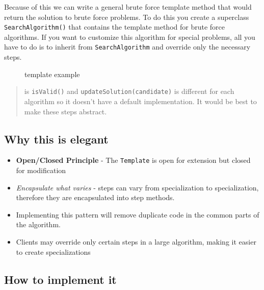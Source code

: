 Because of this we can write a general brute force template method that
would return the solution to brute force problems. To do this you create
a superclass \texttt{SearchAlgorithm()} that contains the template
method for brute force algorithms. If you want to customize this
algorithm for special problems, all you have to do is to inherit from
\texttt{SearchAlgorithm} and override only the necessary steps.

\begin{figure}
\centering
\pandocbounded{}
\caption{template example}
\end{figure}

\begin{quote}
is \texttt{isValid()} and \texttt{updateSolution(candidate)} is
different for each algorithm so it doesn't have a default
implementation. It would be best to make these steps abstract.
\end{quote}

\subsection{Why this is
elegant}\label{behavioral-patterns.md__why-this-is-elegant-4}

\begin{itemize}
\item
  \textbf{Open/Closed Principle} - The \texttt{Template} is open for
  extension but closed for modification
\item
  \emph{Encapsulate what varies} - steps can vary from specialization to
  specialization, therefore they are encapsulated into step methods.
\item
  Implementing this pattern will remove duplicate code in the common
  parts of the algorithm.
\item
  Clients may override only certain steps in a large algorithm, making
  it easier to create specializations
\end{itemize}

\subsection{How to implement
it}\label{behavioral-patterns.md__how-to-implement-it-4}


